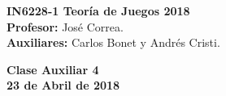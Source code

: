 \documentclass[11pt, spanish]{article}
\theoremstyle{plain}
\begin{document}

\begin{flushleft}
  \textbf{IN6228-1 Teoría de Juegos 2018}
  \\\textbf{Profesor:} José Correa.
  \\\textbf{Auxiliares:} Carlos Bonet y Andrés Cristi.
\end{flushleft}


\begin{center}
  \large{\textbf{Clase Auxiliar 4\\ 23 de Abril de 2018}}
\end{center}

\end{document}
